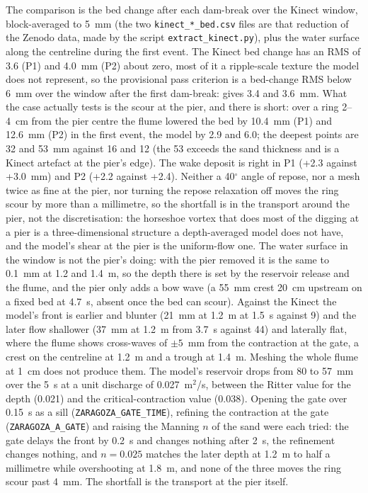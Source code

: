 The comparison is the bed change after each dam-break over the Kinect
window, block-averaged to 5~mm (the two \texttt{kinect\_*\_bed.csv} files
are that reduction of the Zenodo data, made by the script
\texttt{extract\_kinect.py}), plus the water surface along the centreline
during the first event. The Kinect bed change has an RMS of 3.6 (P1) and
4.0~mm (P2) about zero, most of it a ripple-scale texture the model does
not represent, so the provisional pass criterion is a bed-change RMS below
6~mm over the window after the first dam-break: \anuga{} gives 3.4 and
3.6~mm. What the case actually tests is the scour at the pier, and there
\anuga{} is short: over a ring 2--4~cm from the pier centre the flume
lowered the bed by 10.4~mm (P1) and 12.6~mm (P2) in the first event, the
model by 2.9 and 6.0; the deepest points are 32 and 53~mm against 16 and
12 (the 53 exceeds the sand thickness and is a Kinect artefact at the
pier's edge). The wake deposit is right in P1 (+2.3 against +3.0~mm) and
P2 (+2.2 against +2.4). Neither a 40$^\circ$ angle of repose, nor a mesh
twice as fine at the pier, nor turning the repose relaxation off moves the
ring scour by more than a millimetre, so the shortfall is in the transport
around the pier, not the discretisation: the horseshoe vortex that does
most of the digging at a pier is a three-dimensional structure a
depth-averaged model does not have, and the model's shear at the pier is
the uniform-flow one. The water surface in the window is not the pier's doing: with the pier
removed it is the same to 0.1~mm at 1.2 and 1.4~m, so the depth there is
set by the reservoir release and the flume, and the pier only adds a bow
wave (a 55~mm crest 20~cm upstream on a fixed bed at 4.7~s, absent once
the bed can scour). Against the Kinect the model's front is earlier and
blunter (21~mm at 1.2~m at 1.5~s against 9) and the later flow shallower
(37~mm at 1.2~m from 3.7~s against 44) and laterally flat, where the flume
shows cross-waves of $\pm 5$~mm from the contraction at the gate, a crest
on the centreline at 1.2~m and a trough at 1.4~m. Meshing the whole flume
at 1~cm does not produce them. The model's reservoir drops from 80 to
57~mm over the 5~s at a unit discharge of 0.027~m$^2$/s, between the
Ritter value for the depth (0.021) and the critical-contraction value
(0.038). Opening the gate over 0.15~s as a sill (\texttt{ZARAGOZA\_GATE\_TIME}),
refining the contraction at the gate (\texttt{ZARAGOZA\_A\_GATE}) and
raising the Manning $n$ of the sand were each tried: the gate delays the
front by 0.2~s and changes nothing after 2~s, the refinement changes
nothing, and $n = 0.025$ matches the later depth at 1.2~m to half a
millimetre while overshooting at 1.8~m, and none of the three moves the
ring scour past 4~mm. The shortfall is the transport at the pier itself.


